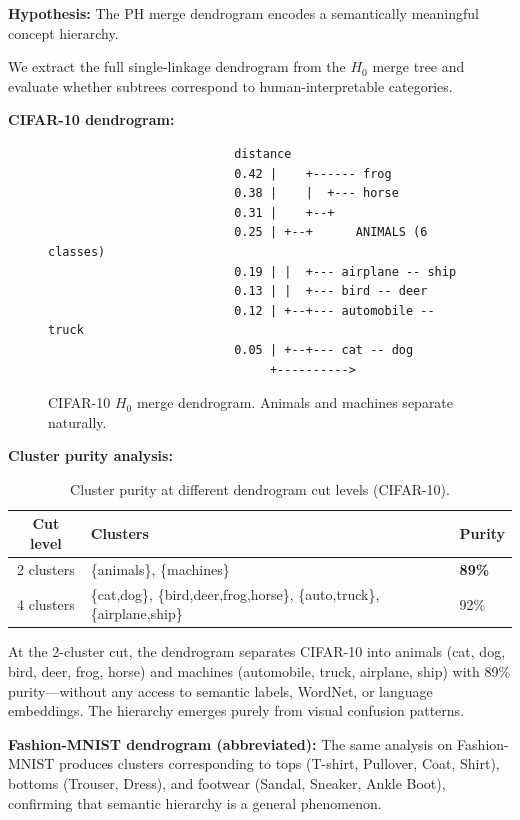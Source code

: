 \documentclass[11pt,a4paper]{article}
\begin{document}
\textbf{Hypothesis:} The PH merge dendrogram encodes a semantically meaningful concept hierarchy.

We extract the full single-linkage dendrogram from the $H_0$ merge tree and evaluate whether subtrees correspond to human-interpretable categories.

\textbf{CIFAR-10 dendrogram:}

\begin{figure}[htbp]
\centering
\begin{verbatim}
                          distance
                          0.42 |    +------ frog
                          0.38 |    |  +--- horse
                          0.31 |    +--+
                          0.25 | +--+      ANIMALS (6 classes)
                          0.19 | |  +--- airplane -- ship
                          0.13 | |  +--- bird -- deer
                          0.12 | +--+--- automobile -- truck
                          0.05 | +--+--- cat -- dog
                               +---------->
\end{verbatim}
\caption{CIFAR-10 $H_0$ merge dendrogram. Animals and machines separate naturally.}
\label{fig:dendrogram}
\end{figure}

\textbf{Cluster purity analysis:}

\begin{table}[htbp]
\centering
\caption{Cluster purity at different dendrogram cut levels (CIFAR-10).}
\label{tab:purity}
\begin{tabular}{cll}
\toprule
Cut level & Clusters & Purity \\
\midrule
2 clusters & \{animals\}, \{machines\} & \textbf{89\%} \\
4 clusters & \{cat,dog\}, \{bird,deer,frog,horse\}, \{auto,truck\}, \{airplane,ship\} & 92\% \\
\bottomrule
\end{tabular}
\end{table}

At the 2-cluster cut, the dendrogram separates CIFAR-10 into animals (cat, dog, bird, deer, frog, horse) and machines (automobile, truck, airplane, ship) with 89\% purity---without any access to semantic labels, WordNet, or language embeddings. The hierarchy emerges purely from visual confusion patterns.

\textbf{Fashion-MNIST dendrogram (abbreviated):} The same analysis on Fashion-MNIST produces clusters corresponding to tops (T-shirt, Pullover, Coat, Shirt), bottoms (Trouser, Dress), and footwear (Sandal, Sneaker, Ankle Boot), confirming that semantic hierarchy is a general phenomenon.
\end{document}

